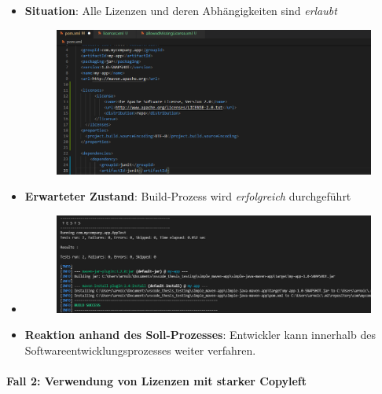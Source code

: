 \begin{itemize}
    \item \textbf{Situation}: Alle Lizenzen und deren Abhängigkeiten sind \textit{erlaubt}
    
    \begin{figure}[h]
        \centering
        \includegraphics[scale=0.5]{Bilder/Fall1Situation.png}
    \end{figure}

    \item \textbf{Erwarteter Zustand}: Build-Prozess wird \textit{erfolgreich} durchgeführt 
    \item {}
    
    \begin{figure}[h]
        \centering
        \includegraphics[scale=0.5]{Bilder/Fall1Zustand.png}
    \end{figure}

    \item \textbf{Reaktion anhand des Soll-Prozesses}: Entwickler kann innerhalb des Softwareentwicklungsprozesses weiter verfahren. 
\end{itemize}

\paragraph{Fall 2: Verwendung von Lizenzen mit starker Copyleft} $~$

